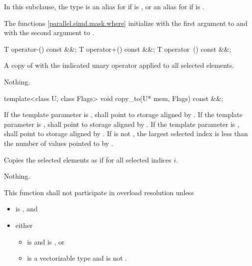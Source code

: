 \pnum
In this subclause, the type  is an alias for  if  is , or an alias for  if  is .

\pnum
\begin{note}
  The  functions \ref{parallel.simd.mask.where} initialize  with the first argument to  and  with the second argument to .
\end{note}

\begin{itemdecl}
T operator-() const &&;
T operator+() const &&;
T operator~() const &&;
\end{itemdecl}

\begin{itemdescr}
  \pnum\returns
  A copy of  with the indicated unary operator applied to all selected elements.

  \pnum\throws Nothing.
\end{itemdescr}

\begin{itemdecl}
template<class U, class Flags> void copy_to(U* mem, Flags) const &&;
\end{itemdecl}

\begin{itemdescr}
  \pnum\requires
  If the template parameter  is ,  shall point to storage aligned by . If the template parameter  is ,  shall point to storage aligned by . If the template parameter  is ,  shall point to storage aligned by . If  is not , the largest selected index is less than the number of values pointed to by .

  \pnum\effects
  Copies the selected elements as if  for all selected indices $i$.

  \pnum\throws Nothing.

  \pnum\remarks
  This function shall not participate in overload resolution unless
  \begin{itemize}
    \item {} is , and
    \item either
      \begin{itemize}
        \item {} is  and  is , or
        \item {} is a vectorizable type and  is not .
      \end{itemize}
  \end{itemize}
\end{itemdescr}

